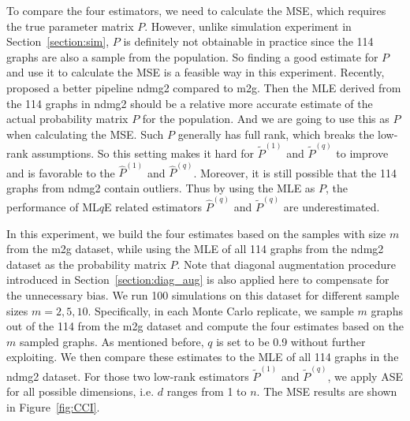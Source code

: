 \documentclass[a4paper]{article}
\renewcommand{\hat}{\widehat}
\begin{document}
To compare the four estimators, we need to calculate the MSE, which requires the true parameter matrix $P$. However, unlike simulation experiment in Section~\ref{section:sim}, $P$ is definitely not obtainable in practice since the 114 graphs are also a sample from the population. So finding a good estimate for $P$ and use it to calculate the MSE is a feasible way in this experiment. Recently, \citet{kiar2016ndmg} proposed a better pipeline ndmg2 compared to m2g. Then the MLE derived from the 114 graphs in ndmg2 should be a relative more accurate estimate of the actual probability matrix $P$ for the population. And we are going to use this as $P$ when calculating the MSE. Such $P$ generally has full rank, which breaks the low-rank assumptions. So this setting makes it hard for $\widetilde{P}^{(1)}$ and $\widetilde{P}^{(q)}$ to improve and is favorable to the $\hat{P}^{(1)}$ and $\hat{P}^{(q)}$. Moreover, it is still possible that the 114 graphs from ndmg2 contain outliers. Thus by using the MLE as $P$, the performance of ML$q$E related estimators $\hat{P}^{(q)}$ and $\widetilde{P}^{(q)}$ are underestimated.

In this experiment, we build the four estimates based on the samples with size $m$ from the m2g dataset, while using the MLE of all 114 graphs from the ndmg2 dataset as the probability matrix $P$. Note that diagonal augmentation procedure introduced in Section~\ref{section:diag_aug} is also applied here to compensate for the unnecessary bias.
We run 100 simulations on this dataset for different sample sizes $m = 2, 5, 10$. Specifically, in each Monte Carlo replicate, we sample $m$ graphs out of the 114 from the m2g dataset and compute the four estimates based on the $m$ sampled graphs. As mentioned before, $q$ is set to be 0.9 without further exploiting. We then compare these estimates to the MLE of all 114 graphs in the ndmg2 dataset.
For those two low-rank estimators $\widetilde{P}^{(1)}$ and $\widetilde{P}^{(q)}$, we apply ASE for all possible dimensions, i.e. $d$ ranges from 1 to $n$. The MSE results are shown in Figure~\ref{fig:CCI}.
\end{document}
